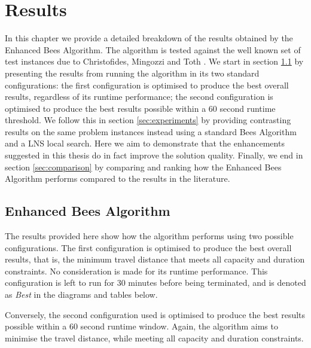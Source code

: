 
\chapter{Results}
\label{chap:results}

In this chapter we provide a detailed breakdown of the results obtained by the Enhanced Bees Algorithm. The algorithm is tested against the well known set of test instances due to Christofides, Mingozzi and Toth \cite{CMT:1981}. We start in section \ref{sec:standardresults} by presenting the results from running the algorithm in its two standard configurations: the first configuration is optimised to produce the best overall results, regardless of its runtime performance; the second configuration is optimised to produce the best results possible within a 60 second runtime threshold. We follow this in section \ref{sec:experiments} by providing contrasting results on the same problem instances instead using a standard Bees Algorithm and a LNS local search. Here we aim to demonstrate that the enhancements suggested in this thesis do in fact improve the solution quality. Finally, we end in section \ref{sec:comparison} by comparing and ranking how the Enhanced Bees Algorithm performs compared to the results in the literature. 

\section{Enhanced Bees Algorithm}
\label{sec:standardresults}

The results provided here show how the algorithm performs using two possible configurations. The first configuration is optimised to produce the best overall results, that is, the minimum travel distance that meets all capacity and duration constraints. No consideration is made for its runtime performance. This configuration is left to run for 30 minutes before being terminated, and is denoted as \emph{Best} in the diagrams and tables below.

Conversely, the second configuration used is optimised to produce the best results possible within a 60 second runtime window. Again, the algorithm aims to minimise the travel distance, while meeting all capacity and duration constraints.



